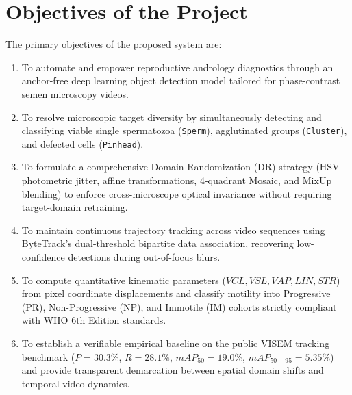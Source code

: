 \documentclass[12pt,a4paper]{report}
\begin{document}
\section{Objectives of the Project}
The primary objectives of the proposed system are:
\begin{enumerate}
    \item To automate and empower reproductive andrology diagnostics through an anchor-free deep learning object detection model tailored for phase-contrast semen microscopy videos.
    \item To resolve microscopic target diversity by simultaneously detecting and classifying viable single spermatozoa (\texttt{Sperm}), agglutinated groups (\texttt{Cluster}), and defected cells (\texttt{Pinhead}).
    \item To formulate a comprehensive Domain Randomization (DR) strategy (HSV photometric jitter, affine transformations, 4-quadrant Mosaic, and MixUp blending) to enforce cross-microscope optical invariance without requiring target-domain retraining.
    \item To maintain continuous trajectory tracking across video sequences using ByteTrack's dual-threshold bipartite data association, recovering low-confidence detections during out-of-focus blurs.
    \item To compute quantitative kinematic parameters ($VCL, VSL, VAP, LIN, STR$) from pixel coordinate displacements and classify motility into Progressive (PR), Non-Progressive (NP), and Immotile (IM) cohorts strictly compliant with WHO 6th Edition standards.
    \item To establish a verifiable empirical baseline on the public VISEM tracking benchmark ($P=30.3\%$, $R=28.1\%$, $mAP_{50}=19.0\%$, $mAP_{50-95}=5.35\%$) and provide transparent demarcation between spatial domain shifts and temporal video dynamics.
\end{enumerate}
\end{document}
